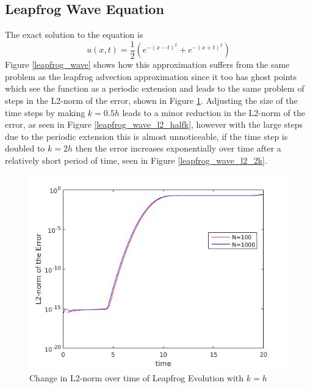 \subsection{Leapfrog Wave Equation}
The exact solution to the equation is
\begin{equation}
u(x,t) = \frac{1}{2}(e^{-(x-t)^2} + e^{-(x+t)^2})
\end{equation}
Figure \ref{leapfrog_wave} shows how this approximation suffers from the same problem as the leapfrog advection approximation since it too has ghost points which see the function as a periodic extension and leads to the same problem of steps in the L2-norm of the error, shown in Figure \ref{leapfrog_wave_l2}. Adjusting the size of the time steps by making $k=0.5h$ leads to a minor reduction in the L2-norm of the error, as seen in Figure \ref{leapfrog_wave_l2_halfk}, however with the large steps due to the periodic extension this is almost unnoticeable, if the time step is doubled to $k=2h$ then the error increases exponentially over time after a relatively short period of time, seen in Figure \ref{leapfrog_wave_l2_2k}.
\begin{figure}[H] 
 \includegraphics[scale=0.5]{Images/leapfrog_wave_l2.jpg}
 \caption{Change in L2-norm over time of Leapfrog Evolution with $k = h$}
 \label{leapfrog_wave_l2}
\end{figure}
